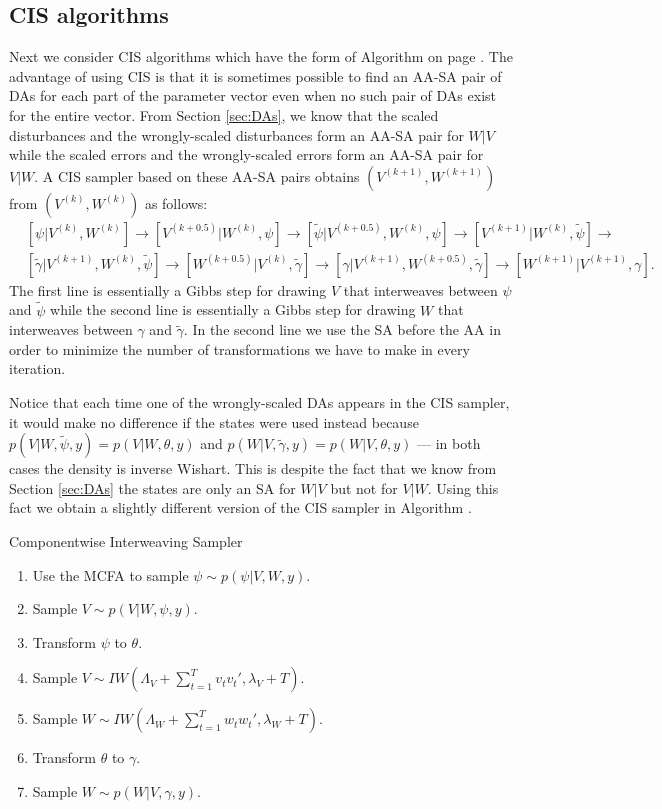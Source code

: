 \documentclass[12pt]{article}
\begin{document}
\subsection{CIS algorithms}\label{sec:Algs:CIS}
Next we consider CIS algorithms which have the form of Algorithm  on page \pageref{alg:CIS}. The advantage of using CIS is that it is sometimes possible to find an AA-SA pair of DAs for each part of the parameter vector even when no such pair of DAs exist for the entire vector. From Section \ref{sec:DAs}, we know that the scaled disturbances and the wrongly-scaled disturbances form an AA-SA pair for $W|V$ while the scaled errors and the wrongly-scaled errors form an AA-SA pair for $V|W$.  A CIS sampler based on these AA-SA pairs obtains $(V^{(k+1)},W^{(k+1)})$ from $(V^{(k)},W^{(k)})$ as follows:
\begin{align*}
&[\psi|V^{(k)},W^{(k)}] \to [V^{(k+0.5)}|W^{(k)},\psi] \to [\tilde{\psi}|V^{(k+0.5)},W^{(k)},\psi] \to [V^{(k+1)}|W^{(k)},\tilde{\psi}]\to\\
&[\tilde{\gamma}|V^{(k+1)},W^{(k)},\tilde{\psi}] \to [W^{(k+0.5)}|V^{(k)},\tilde{\gamma}] \to [\gamma|V^{(k+1)},W^{(k+0.5)},\tilde{\gamma}]\to [W^{(k+1)}|V^{(k+1)},\gamma].
\end{align*}
The first line is essentially a Gibbs step for drawing $V$ that interweaves between $\psi$ and $\tilde{\psi}$ while the second line is essentially a Gibbs step for drawing $W$ that interweaves between $\gamma$ and $\tilde{\gamma}$. In the second line we use the SA before the AA in order to minimize the number of transformations we have to make in every iteration. 

Notice that each time one of the wrongly-scaled DAs appears in the CIS sampler, it would make no difference if the states were used instead because $p(V|W,\tilde{\psi},y)=p(V|W,\theta,y)$ and $p(W|V,\tilde{\gamma},y)=p(W|V,\theta,y)$ --- in both cases the density is inverse Wishart. This is despite the fact that we know from Section \ref{sec:DAs} the states are only an SA for $W|V$ but not for $V|W$. Using this fact we obtain a slightly different version of the CIS sampler in Algorithm .
\begin{alg*}[CIS]Componentwise Interweaving Sampler\label{alg:DLMcis}
\begin{enumerate}
\item Use the MCFA to sample $\psi \sim p(\psi|V,W,y)$.
\item Sample $V \sim p(V|W,\psi,y)$.
\item Transform $\psi$ to $\theta$.
\item Sample $V \sim IW\left(\Lambda_V + \sum_{t=1}^Tv_tv_t',\lambda_V + T\right)$.
\item Sample $W \sim IW\left(\Lambda_W + \sum_{t=1}^Tw_tw_t',\lambda_{W} + T\right)$.
\item Transform $\theta$ to $\gamma$.
\item Sample $W \sim p(W|V,\gamma,y)$.
\end{enumerate}
\end{alg*}
\end{document}
